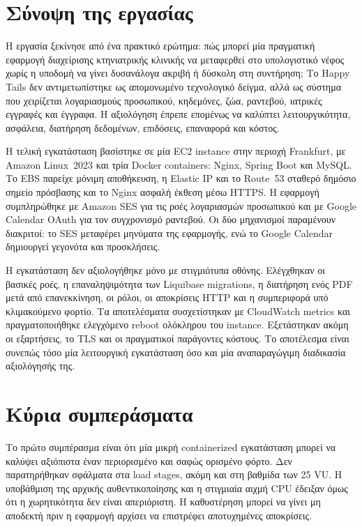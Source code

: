 \section{Σύνοψη της εργασίας}
Η εργασία ξεκίνησε από ένα πρακτικό ερώτημα: πώς μπορεί μία πραγματική
εφαρμογή διαχείρισης κτηνιατρικής κλινικής να μεταφερθεί στο υπολογιστικό
νέφος χωρίς η υποδομή να γίνει δυσανάλογα ακριβή ή δύσκολη στη συντήρηση;
Το Happy Tails δεν αντιμετωπίστηκε ως απομονωμένο τεχνολογικό δείγμα, αλλά
ως σύστημα που χειρίζεται λογαριασμούς προσωπικού, κηδεμόνες, ζώα, ραντεβού,
ιατρικές εγγραφές και έγγραφα. Η αξιολόγηση έπρεπε επομένως να καλύπτει
λειτουργικότητα, ασφάλεια, διατήρηση δεδομένων, επιδόσεις, επαναφορά και κόστος.

Η τελική εγκατάσταση βασίστηκε σε μία EC2 instance στην περιοχή Frankfurt,
με Amazon Linux~2023 και τρία Docker containers: Nginx, Spring Boot και
MySQL. Το EBS παρείχε μόνιμη αποθήκευση, η Elastic IP και το Route~53
σταθερό δημόσιο σημείο πρόσβασης και το Nginx ασφαλή έκθεση μέσω HTTPS. Η
εφαρμογή συμπληρώθηκε με Amazon SES για τις ροές λογαριασμών προσωπικού και
με Google Calendar OAuth για τον συγχρονισμό ραντεβού. Οι δύο μηχανισμοί
παραμένουν διακριτοί: το SES μεταφέρει μηνύματα της εφαρμογής, ενώ το Google
Calendar δημιουργεί γεγονότα και προσκλήσεις.

Η εγκατάσταση δεν αξιολογήθηκε μόνο με στιγμιότυπα οθόνης. Ελέγχθηκαν οι
βασικές ροές, η επαναληψιμότητα των Liquibase migrations, η διατήρηση ενός
PDF μετά από επανεκκίνηση, οι ρόλοι, οι αποκρίσεις HTTP και η συμπεριφορά υπό
κλιμακούμενο φορτίο. Τα αποτελέσματα συσχετίστηκαν με CloudWatch metrics και
πραγματοποιήθηκε ελεγχόμενο reboot ολόκληρου του instance. Εξετάστηκαν ακόμη
οι εξαρτήσεις, το TLS και οι πραγματικοί παράγοντες κόστους. Το αποτέλεσμα
είναι συνεπώς τόσο μία λειτουργική εγκατάσταση όσο και μία αναπαραγώγιμη
διαδικασία αξιολόγησής της.

\section{Κύρια συμπεράσματα}
Το πρώτο συμπέρασμα είναι ότι μία μικρή containerized εγκατάσταση μπορεί να
καλύψει αξιόπιστα έναν περιορισμένο και σαφώς ορισμένο φόρτο. Δεν
παρατηρήθηκαν σφάλματα στα load stages, ακόμη και στη βαθμίδα των 25 VU. Η
υποβάθμιση της αρχικής αυθεντικοποίησης και η στιγμιαία αιχμή CPU έδειξαν
όμως ότι η χωρητικότητα δεν είναι απεριόριστη. Η καθυστέρηση μπορεί να γίνει
μη αποδεκτή πριν η εφαρμογή αρχίσει να επιστρέφει αποτυχημένες αποκρίσεις.

